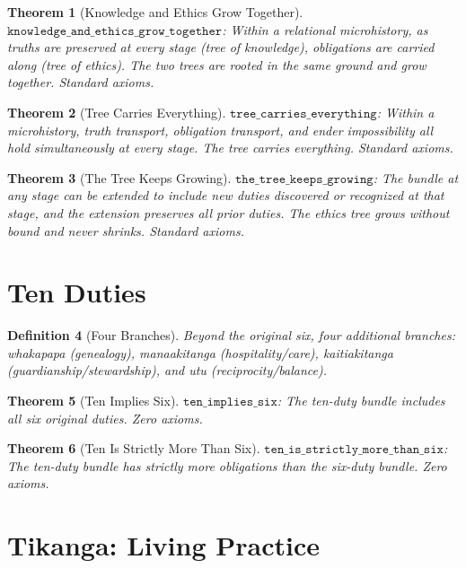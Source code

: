 \documentclass[12pt,a4paper]{article}
\newtheorem{theorem}{Theorem}[section]
\newtheorem{definition}[theorem]{Definition}
\begin{document}
\begin{theorem}[Knowledge and Ethics Grow Together]\label{thm:grow}
$\texttt{knowledge\_and\_ethics\_grow\_together}$: Within a relational
microhistory, as truths are preserved at every stage (tree of knowledge),
obligations are carried along (tree of ethics). The two trees are rooted
in the same ground and grow together. Standard axioms.
\end{theorem}

\begin{theorem}[Tree Carries Everything]\label{thm:carries}
$\texttt{tree\_carries\_everything}$: Within a microhistory, truth
transport, obligation transport, and ender impossibility all hold
simultaneously at every stage. The tree carries everything. Standard axioms.
\end{theorem}

\begin{theorem}[The Tree Keeps Growing]\label{thm:keeps-growing}
$\texttt{the\_tree\_keeps\_growing}$: The bundle at any stage can be extended
to include new duties discovered or recognized at that stage, and the
extension preserves all prior duties. The ethics tree grows without bound
and never shrinks. Standard axioms.
\end{theorem}

\section{Ten Duties}

\begin{definition}[Four Branches]
Beyond the original six, four additional branches:
whakapapa (genealogy), manaakitanga (hospitality/care), kaitiakitanga
(guardianship/stewardship), and utu (reciprocity/balance).
\end{definition}

\begin{theorem}[Ten Implies Six]\label{thm:ten-six}
$\texttt{ten\_implies\_six}$: The ten-duty bundle includes all six
original duties. Zero axioms.
\end{theorem}

\begin{theorem}[Ten Is Strictly More Than Six]\label{thm:ten-strict}
$\texttt{ten\_is\_strictly\_more\_than\_six}$: The ten-duty bundle has
strictly more obligations than the six-duty bundle. Zero axioms.
\end{theorem}

\section{Tikanga: Living Practice}
\end{document}
